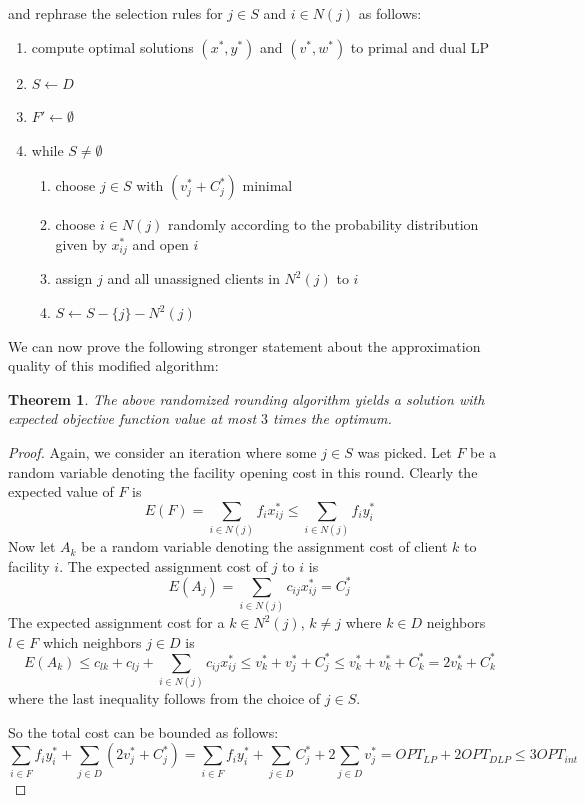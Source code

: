 \documentclass{article}
\newtheorem{theorem}{Theorem}
\begin{document}
and rephrase the selection rules for $j\in S$ and $i\in N(j)$ as follows:
\begin{enumerate}
\item compute optimal solutions $(x^*, y^*)$ and $(v^*,w^*)$ to primal and dual LP
\item $S\leftarrow D$
\item $F'\leftarrow\emptyset$
\item while $S\neq \emptyset$
	\begin{enumerate}
	\item choose $j\in S$ with $(v_j^*+C_j^*)$ minimal
	\item choose $i\in N(j)$ randomly according to the probability distribution given by $x^*_{ij}$ and open $i$
	\item assign $j$ and all unassigned clients in $N^2(j)$ to $i$
	\item $S\leftarrow S-\{j\}-N^2(j)$
	\end{enumerate}
\end{enumerate}

We can now prove the following stronger statement about the approximation quality of this modified algorithm:

\begin{theorem}
The above randomized rounding algorithm yields a solution with expected objective function value at most $3$ times the optimum.
\end{theorem}
\begin{proof}
Again, we consider an iteration where some $j\in S$ was picked. Let $F$ be a random variable denoting the facility opening cost in this round. Clearly the expected value of $F$ is
\[
E(F)=\sum_{i\in N(j)}f_i x^*_{ij}\leq \sum_{i\in N(j)} f_i y^*_i
\]
Now let $A_k$ be a random variable denoting the assignment cost of client $k$ to facility $i$. The expected assignment cost of $j$ to $i$ is
\[
	E(A_j)=\sum_{i\in N(j)} c_{ij} x^*_{ij}=C_j^*
\] 
The expected assignment cost for a $k\in N^2(j)$, $k\neq j$ where $k\in D$ neighbors $l\in F$ which neighbors $j\in D$ is
\[
	E(A_k)\leq c_{lk} + c_{lj} + \sum_{i\in N(j)}c_{ij}x^*_{ij}\leq v^*_k + v^*_j+ C^*_j \leq v^*_k + v^*_k + C^*_k=2v^*_k +C^*_k
\]
where the last inequality follows from the choice of $j\in S$.

So the total cost can be bounded as follows:
\[
	\sum_{i\in F} f_i y^*_i + \sum_{j\in D} (2v_j^* + C^*_j) = \sum_{i\in F}f_i y^*_i + \sum_{j\in D}C^*_j +  2\sum_{j\in D} v^*_j=OPT_{LP}+2 OPT_{DLP}\leq 3 OPT_{int}
\]
\end{proof}
\end{document}
